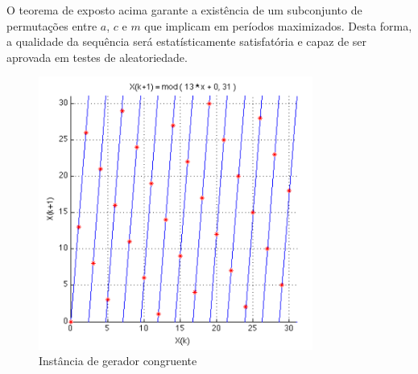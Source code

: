 \documentclass[a4paper,12pt]{monografia}
\theoremstyle{plain}
\theoremstyle{definition}
\theoremstyle{remark}
\begin{document}
O teorema de  exposto acima garante a exist\^{e}ncia de um subconjunto de permuta\c{c}\~{o}es entre $a$, $c$ e $m$ que implicam em per\'{i}odos maximizados. Desta forma, a qualidade da sequ\^{e}ncia ser\'{a} estat\'{i}sticamente satisfat\'{o}ria e capaz de ser aprovada em testes de aleatoriedade.

\begin{figure}[ht]
 \begin{center}
   \includegraphics[width=90mm,scale=0.6]{./figs/prng.png}
   \caption{Inst\^{a}ncia de gerador congruente}
   \label{fig:prng}
 \end{center}
\end{figure}
\end{document}
